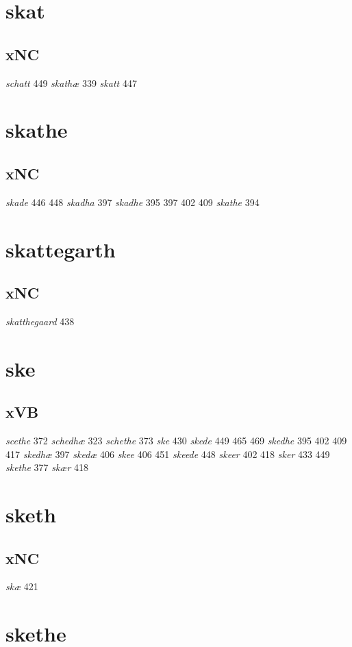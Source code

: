\documentclass[a4paper,twocolumn]{article}
\begin{document}
\section{skat}
\label{sec:orgff21306}
\subsection{xNC}
\label{sec:org6c7d15a}
\emph{schatt} 449 \emph{skathæ} 339 \emph{skatt} 447 
\section{skathe}
\label{sec:orgb41bd79}
\subsection{xNC}
\label{sec:orgafdd69a}
\emph{skade} 446 448 \emph{skadha} 397 \emph{skadhe} 395 397 402 409 \emph{skathe} 394 
\section{skattegarth}
\label{sec:orgc61a4ad}
\subsection{xNC}
\label{sec:org5466ffe}
\emph{skatthegaard} 438 
\section{ske}
\label{sec:org29cee14}
\subsection{xVB}
\label{sec:orgaebc807}
\emph{scethe} 372 \emph{schedhæ} 323 \emph{schethe} 373 \emph{ske} 430 \emph{skede} 449 465 469 \emph{skedhe} 395 402 409 417 \emph{skedhæ} 397 \emph{skedæ} 406 \emph{skee} 406 451 \emph{skeede} 448 \emph{skeer} 402 418 \emph{sker} 433 449 \emph{skethe} 377 \emph{skær} 418 
\section{sketh}
\label{sec:orgeb45195}
\subsection{xNC}
\label{sec:org16858d8}
\emph{skæ} 421 
\section{skethe}
\label{sec:org99ba9e0}
\end{document}

